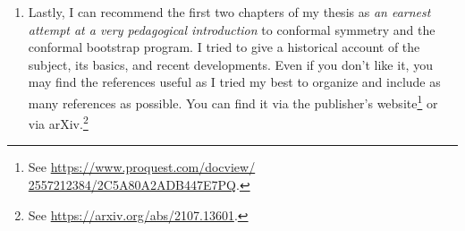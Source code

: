 \begin{enumerate}
	\item Lastly, I can recommend the first two chapters of my thesis as \emph{an earnest attempt at a very pedagogical introduction} to conformal symmetry and the conformal bootstrap program. I tried to give a historical account of the subject, its basics, and recent developments. Even if you don't like it, you may find the references useful as I tried my best to organize and include as many references as possible. You can find it via the publisher's website\footnote{See \hyperref{https://www.proquest.com/docview/2557212384/2C5A80A2ADB447E7PQ}{}{}{https://www.proquest.com/docview/\\2557212384/2C5A80A2ADB447E7PQ}.} or via arXiv.\footnote{See \hyperref{https://arxiv.org/abs/2107.13601}{}{}{https://arxiv.org/abs/2107.13601}.}
\end{enumerate}